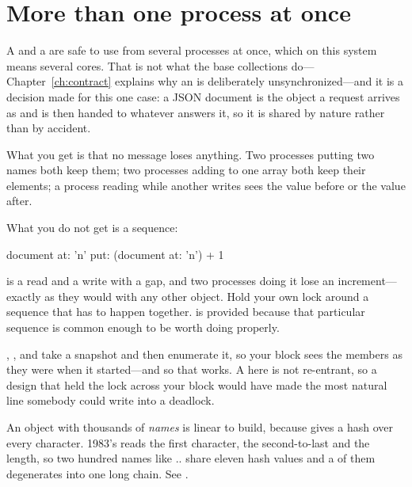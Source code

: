 \section{More than one process at once}

A  and a  are safe to use from several processes
at once, which on this system means several cores. That is not what the base
collections do---Chapter~\ref{ch:contract} explains why an
 is deliberately unsynchronized---and it is a decision
made for this one case: a JSON document is the object a request arrives as and
is then handed to whatever answers it, so it is shared by nature rather than by
accident.

What you get is that no message loses anything. Two processes putting two names
both keep them; two processes adding to one array both keep their elements; a
process reading while another writes sees the value before or the value after.

What you do not get is a sequence:

\begin{st}
document at: 'n' put: (document at: 'n') + 1
\end{st}

\noindent is a read and a write with a gap, and two processes doing it lose an
increment---exactly as they would with any other object. Hold your own lock
around a sequence that has to happen together.  is provided
because that particular sequence is common enough to be worth doing properly.

\begin{stnote}
, ,  and  take a
snapshot and then enumerate it, so your block sees the members as they were when
it started---and so that  works. A
 here is not re-entrant, so a design that held the lock across your
block would have made the most natural line somebody could write into a
deadlock.
\end{stnote}

\begin{stnote}
An object with thousands of \emph{names} is linear to build, because
 gives  a hash over every character.
1983's  reads the first character, the second-to-last and the
length, so two hundred names like .. share eleven hash
values and a  of them degenerates into one long chain. See
.
\end{stnote}

